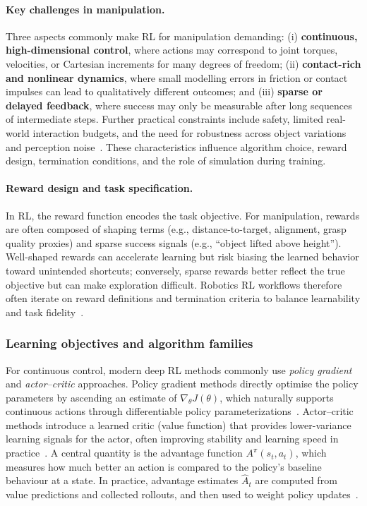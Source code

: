 \paragraph{Key challenges in manipulation.}
Three aspects commonly make \ac{RL} for manipulation demanding:
(i) \textbf{continuous, high-dimensional control}, where actions may correspond to joint torques, velocities, or
Cartesian increments for many degrees of freedom;
(ii) \textbf{contact-rich and nonlinear dynamics}, where small modelling errors in friction or contact impulses can lead
to qualitatively different outcomes; and
(iii) \textbf{sparse or delayed feedback}, where success may only be measurable after long sequences of intermediate steps.
Further practical constraints include safety, limited real-world interaction budgets, and the need for robustness across
object variations and perception noise~\cite{Kober2013Survey}. These characteristics influence algorithm choice,
reward design, termination conditions, and the role of simulation during training.

\paragraph{Reward design and task specification.}
In \ac{RL}, the reward function encodes the task objective. For manipulation, rewards are often composed of shaping terms
(e.g., distance-to-target, alignment, grasp quality proxies) and sparse success signals (e.g., ``object lifted above
height''). Well-shaped rewards can accelerate learning but risk biasing the learned behavior toward unintended shortcuts;
conversely, sparse rewards better reflect the true objective but can make exploration difficult. Robotics \ac{RL} workflows
therefore often iterate on reward definitions and termination criteria to balance learnability and task fidelity~\cite{Kober2013Survey,SuttonBarto2018}.

\subsubsection{Learning objectives and algorithm families}
\label{sec:rl_algorithm_families}

For continuous control, modern deep \ac{RL} methods commonly use \emph{policy gradient} and \emph{actor--critic} approaches.
Policy gradient methods directly optimise the policy parameters by ascending an estimate of $\nabla_\theta J(\theta)$,
which naturally supports continuous actions through differentiable policy parameterizations~\cite{SuttonBarto2018}.
Actor--critic methods introduce a learned critic (value function) that provides lower-variance learning signals for the actor,
often improving stability and learning speed in practice~\cite{SuttonBarto2018}.
A central quantity is the advantage function $A^\pi(s_t,a_t)$, which measures how much better an action is compared to the
policy's baseline behaviour at a state. In practice, advantage estimates $\hat{A}_t$ are computed from value predictions
and collected rollouts, and then used to weight policy updates~\cite{SuttonBarto2018}.

